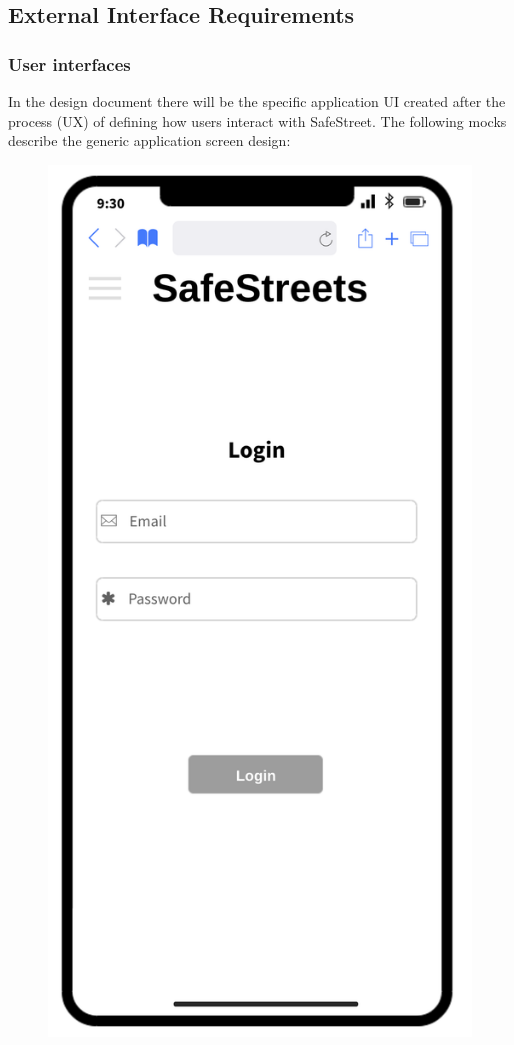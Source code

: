 
\subsection{External Interface Requirements}
\subsubsection{User interfaces}
In the design document there will be the specific application UI created after the process (UX) of defining how users interact with SafeStreet.
The following mocks describe the generic application screen design:

	\begin{figure}[H]
		\centering
		\begin{minipage}[b]{0.40\textwidth}
			\includegraphics[width=\textwidth]{Images/rasd-mocks/login.png}

\end{minipage}
\end{figure}
